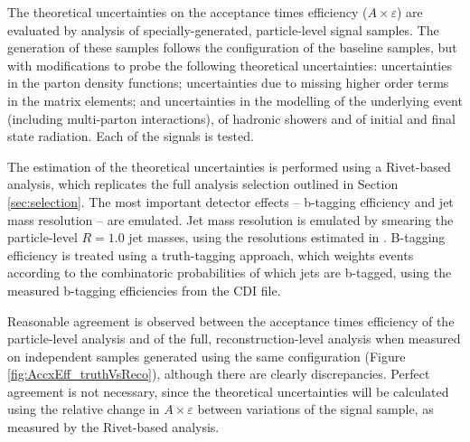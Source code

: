 The theoretical uncertainties on the acceptance times efficiency ($A\times\varepsilon$) are evaluated by analysis of specially-generated, particle-level signal samples. The generation of these samples follows the configuration of the baseline samples, but with modifications to probe the following theoretical uncertainties: uncertainties in the parton density functions; uncertainties due to missing higher order terms in the matrix elements; and uncertainties in the modelling of the underlying event (including multi-parton interactions), of hadronic showers and of initial and final state radiation. Each of the signals is tested.

The estimation of the theoretical uncertainties is performed using a Rivet-based analysis, which replicates the full analysis selection outlined in Section \ref{sec:selection}. The most important detector effects -- b-tagging efficiency and jet mass resolution -- are emulated. Jet mass resolution is emulated by smearing the particle-level $R=1.0$ jet masses, using the resolutions estimated in \cite{ATLAS-CONF-2016-035}. B-tagging efficiency is treated using a truth-tagging approach, which weights events according to the combinatoric probabilities of which jets are b-tagged, using the measured b-tagging efficiencies from the CDI file. 

Reasonable agreement is observed between the acceptance times efficiency of the particle-level analysis and of the full, reconstruction-level analysis when measured on independent samples generated using the same configuration (Figure \ref{fig:AccxEff_truthVsReco}), although there are clearly discrepancies. Perfect agreement is not necessary, since the theoretical uncertainties will be calculated using the relative change in $A\times\varepsilon$ between variations of the signal sample, as measured by the Rivet-based analysis.

